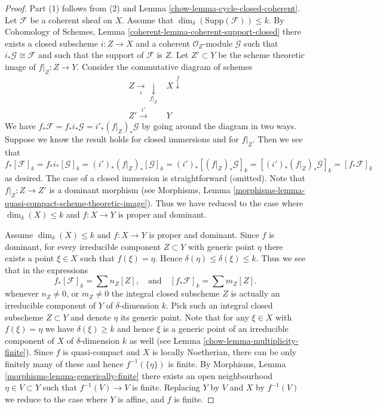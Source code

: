 \begin{proof}

Part (1) follows from (2) and Lemma \ref{chow-lemma-cycle-closed-coherent}.
Let $\mathcal{F}$ be a coherent sheaf on $X$.
Assume that $\dim_\delta(\text{Supp}(\mathcal{F})) \leq k$.
By Cohomology of Schemes, Lemma \ref{coherent-lemma-coherent-support-closed}
there exists a closed subscheme $i : Z \to X$ and a coherent
$\mathcal{O}_Z$-module $\mathcal{G}$ such that
$i_*\mathcal{G} \cong \mathcal{F}$ and such that the support
of $\mathcal{F}$ is $Z$. Let $Z' \subset Y$ be the scheme theoretic image
of $f|_Z : Z \to Y$. Consider the commutative diagram of schemes
$$
\begin{array}{cc}Z \underset{i}{\longrightarrow}\underset{f|_Z}{\downarrow} & X \overset{f}{\downarrow} \\ Z' \overset{i'}{\longrightarrow} & Y\end{array}
$$
We have $f_*\mathcal{F} = f_*i_*\mathcal{G} = i'_*(f|_Z)_*\mathcal{G}$
by going around the diagram in two ways. Suppose we know the result holds
for closed immersions and for $f|_Z$. Then we see that
$$
f_*[\mathcal{F}]_k = f_*i_*[\mathcal{G}]_k
= (i')_*(f|_Z)_*[\mathcal{G}]_k =
(i')_*[(f|_Z)_*\mathcal{G}]_k =
[(i')_*(f|_Z)_*\mathcal{G}]_k = [f_*\mathcal{F}]_k
$$
as desired. The case of a closed immersion is straightforward (omitted).
Note that $f|_Z : Z \to Z'$ is a dominant morphism (see
Morphisms, Lemma \ref{morphisms-lemma-quasi-compact-scheme-theoretic-image}).
Thus we have reduced to the case where
$\dim_\delta(X) \leq k$ and $f : X \to Y$ is proper and dominant.

\medskip\noindent
Assume $\dim_\delta(X) \leq k$ and $f : X \to Y$ is proper and dominant.
Since $f$ is dominant, for every irreducible component $Z \subset Y$
with generic point $\eta$ there exists a point $\xi \in X$ such
that $f(\xi) = \eta$. Hence $\delta(\eta) \leq \delta(\xi) \leq k$.
Thus we see that in the expressions
$$
f_*[\mathcal{F}]_k = \sum n_Z[Z],
\quad
\text{and}
\quad
[f_*\mathcal{F}]_k = \sum m_Z[Z].
$$
whenever $n_Z \not = 0$, or $m_Z \not = 0$ the integral closed
subscheme $Z$ is actually an irreducible component of $Y$ of
$\delta$-dimension $k$. Pick such an integral closed subscheme
$Z \subset Y$ and denote $\eta$ its generic point. Note that for
any $\xi \in X$ with $f(\xi) = \eta$ we have $\delta(\xi) \geq k$
and hence $\xi$ is a generic point of an irreducible component
of $X$ of $\delta$-dimension $k$ as well
(see Lemma \ref{chow-lemma-multiplicity-finite}). Since $f$ is quasi-compact
and $X$ is locally Noetherian, there can be only finitely many of
these and hence $f^{-1}(\{\eta\})$ is finite.
By Morphisms, Lemma \ref{morphisms-lemma-generically-finite} there exists
an open neighbourhood $\eta \in V \subset Y$ such that $f^{-1}(V) \to V$
is finite. Replacing $Y$ by $V$ and $X$ by $f^{-1}(V)$ we reduce to the
case where $Y$ is affine, and $f$ is finite.


\end{proof}
